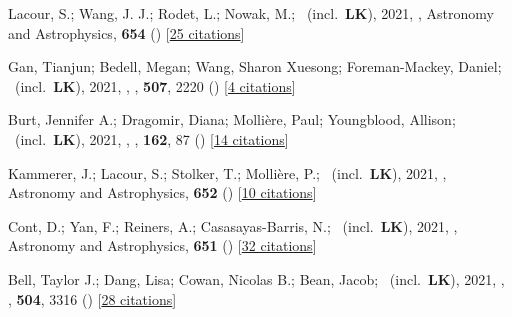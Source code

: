\item[{\color{numcolor}\scriptsize59}] Lacour, S.; Wang, J. J.; Rodet, L.; Nowak, M.; \etal\ (incl.\ \textbf{LK}), 2021, , Astronomy and Astrophysics, \textbf{654} () [\href{https://ui.adsabs.harvard.edu/abs/2021A&A...654L...2L}{25 citations}]

\item[{\color{numcolor}\scriptsize58}] Gan, Tianjun; Bedell, Megan; Wang, Sharon Xuesong; Foreman-Mackey, Daniel; \etal\ (incl.\ \textbf{LK}), 2021, , \mnras, \textbf{507}, 2220 () [\href{https://ui.adsabs.harvard.edu/abs/2021MNRAS.507.2220G}{4 citations}]

\item[{\color{numcolor}\scriptsize57}] Burt, Jennifer A.; Dragomir, Diana; Molli{\`e}re, Paul; Youngblood, Allison; \etal\ (incl.\ \textbf{LK}), 2021, , \aj, \textbf{162}, 87 () [\href{https://ui.adsabs.harvard.edu/abs/2021AJ....162...87B}{14 citations}]

\item[{\color{numcolor}\scriptsize56}] Kammerer, J.; Lacour, S.; Stolker, T.; Molli{\`e}re, P.; \etal\ (incl.\ \textbf{LK}), 2021, , Astronomy and Astrophysics, \textbf{652} () [\href{https://ui.adsabs.harvard.edu/abs/2021A&A...652A..57K}{10 citations}]

\item[{\color{numcolor}\scriptsize55}] Cont, D.; Yan, F.; Reiners, A.; Casasayas-Barris, N.; \etal\ (incl.\ \textbf{LK}), 2021, , Astronomy and Astrophysics, \textbf{651} () [\href{https://ui.adsabs.harvard.edu/abs/2021A&A...651A..33C}{32 citations}]

\item[{\color{numcolor}\scriptsize54}] Bell, Taylor J.; Dang, Lisa; Cowan, Nicolas B.; Bean, Jacob; \etal\ (incl.\ \textbf{LK}), 2021, , \mnras, \textbf{504}, 3316 () [\href{https://ui.adsabs.harvard.edu/abs/2021MNRAS.504.3316B}{28 citations}]

